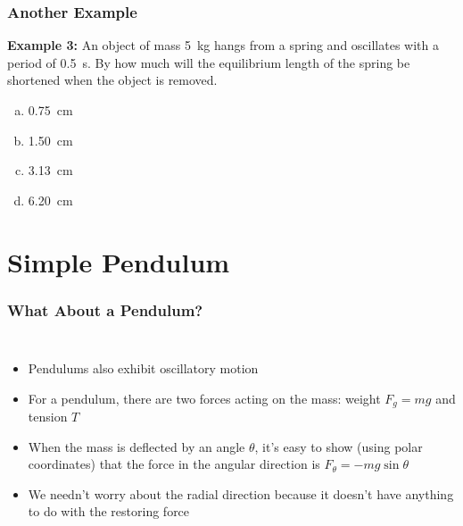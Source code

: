 \documentclass[12pt,compress,aspectratio=169]{beamer}
\begin{document}
\begin{frame}
  \frametitle{Another Example}
  \textbf{Example 3:} An object of mass \SI{5}{\kg} hangs from a spring and
  oscillates with a period of \SI{0.5}{\second}. By how much will the
  equilibrium length of the spring be shortened when the object is removed.
  \begin{enumerate}[(a)]
  \item\SI{0.75}{\centi\metre}
  \item\SI{1.50}{\centi\metre}
  \item\SI{3.13}{\centi\metre}
  \item\SI{6.20}{\centi\metre}
  \end{enumerate}
\end{frame}



\section{Simple Pendulum}

\begin{frame}
  \frametitle{What About a Pendulum?}
  \begin{columns}
    \begin{itemize}
    \item Pendulums also exhibit oscillatory motion
    \item For a pendulum, there are two forces acting on the mass: weight
      $F_g=mg$ and tension $T$
    \item When the mass is deflected by an angle $\theta$, it's easy to show
      (using polar coordinates) that the force in the angular direction is
      $F_\theta=-mg\sin\theta$
    \item We needn't worry about the radial direction because it doesn't
      have anything to do with the restoring force
    \end{itemize}

  \end{columns}
\end{frame}
\end{document}
